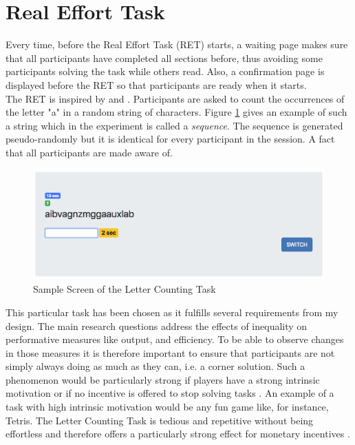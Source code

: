     
    \section{Real Effort Task}
    \label{ss:RET}
    
    Every time, before the Real Effort Task (RET) starts, a waiting page makes sure that all participants have completed all sections before, thus avoiding some participants solving the task while others read. Also, a confirmation page is displayed before the RET so that participants are ready when it starts.\\
    
    The RET is inspired by \cite{rey-biel2016} and \cite{giusti2014}. Participants are asked to count the occurrences of the letter "a" in a random string of characters. Figure \ref{fig:LC_screen} gives an example of such a string which in the experiment is called a \textit{sequence}. The sequence is generated pseudo-randomly but it is identical for every participant in the session. A fact that all participants are made aware of.\\ 
    
    \begin{figure}
        \centering
        \includegraphics[width=\textwidth]{graphs/screenshot_RET_alone.png}
        \caption{Sample Screen of the Letter Counting Task}
        \label{fig:LC_screen}
    \end{figure}
    
    This particular task has been chosen as it fulfills several requirements from my design. The main research questions address the effects of inequality on performative measures like output, and efficiency. To be able to observe changes in those measures it is therefore important to ensure that participants are not simply always doing as much as they can, i.e. a corner solution. Such a phenomenon would be particularly strong if players have a strong intrinsic motivation or if no incentive is offered to stop solving tasks \citep{frey1997}. An example of a task with high intrinsic motivation would be any fun game like, for instance, Tetris.
    The Letter Counting Task is tedious and repetitive without being effortless and therefore offers a particularly strong effect for monetary incentives \citep{cerasoli2014}.\\ 
    
